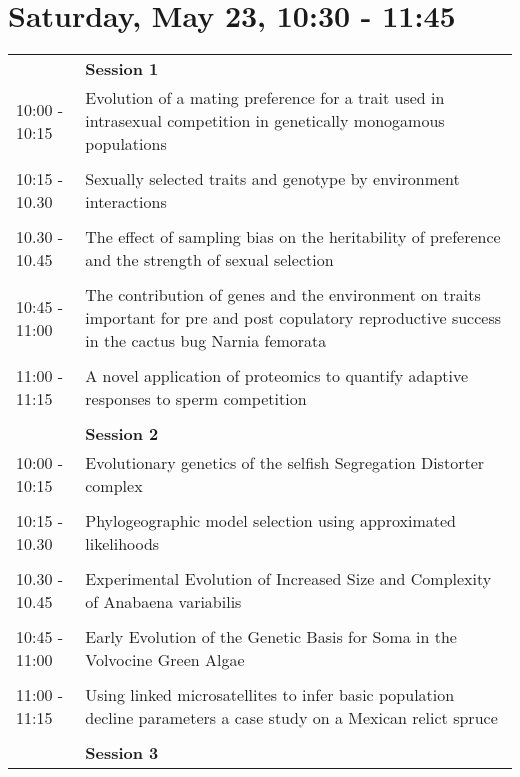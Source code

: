 \documentclass{article}
\begin{document}
\section{Saturday, May 23, 10:30 - 11:45}
\begin{longtabu} to \textwidth {lX}
 & \textbf{Session 1} \\ 

10:00 - 10:15 & Evolution of a mating preference for a trait used in intrasexual competition in genetically monogamous populations \\ 
 &  \\ 
10:15 - 10.30 & Sexually selected traits and genotype by environment interactions \\ 
 &  \\ 
10.30 - 10.45 & The effect of sampling bias on the heritability of preference and the strength of  sexual selection \\ 
 &  \\ 
10:45 - 11:00 & The contribution of genes and the environment on traits important for pre and post copulatory reproductive success in the cactus bug  Narnia femorata \\ 
 &  \\ 
11:00 - 11:15 & A novel application of proteomics to quantify adaptive responses to sperm competition \\ 
 &  \\ 
 & \textbf{Session 2} \\ 

10:00 - 10:15 & Evolutionary genetics of the selfish Segregation Distorter complex \\ 
 &  \\ 
10:15 - 10.30 & Phylogeographic model selection using approximated likelihoods \\ 
 &  \\ 
10.30 - 10.45 & Experimental Evolution of Increased Size and Complexity of Anabaena variabilis \\ 
 &  \\ 
10:45 - 11:00 & Early Evolution of the Genetic Basis for Soma in the Volvocine Green Algae \\ 
 &  \\ 
11:00 - 11:15 & Using linked microsatellites to infer basic population decline parameters  a case study on a Mexican relict spruce \\ 
 &  \\ 
 & \textbf{Session 3} \\ 


\end{longtabu}
\end{document}
